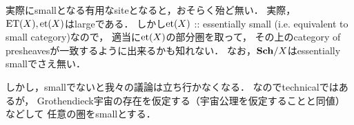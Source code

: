 \begin{Remark}
    実際にsmallとなる有用なsiteとなると，おそらく殆ど無い．
    実際，$\mathrm{ET}(X), \mathrm{et}(X)$はlargeである．
    しかし$\mathrm{et}(X)$ :: essentially small (i.e. equivalent to small category)なので，
    適当に$\mathrm{et}(X)$の部分圏を取って，
    その上のcategory of presheavesが一致するように出来るかも知れない．
    なお，$\mathbf{Sch}/X$はessentially smallでさえ無い．

    しかし，smallでないと我々の議論は立ち行かなくなる．
    なのでtechnicalではあるが，
    Grothendieck宇宙の存在を仮定する（宇宙公理を仮定することと同値）などして
    任意の圏をsmallとする．
\end{Remark}




